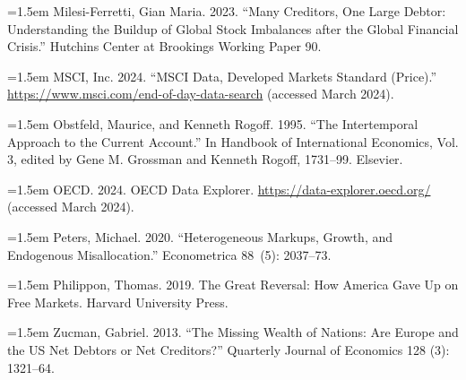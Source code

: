 \documentclass[11pt]{article}
\begin{document}
\noindent\hangindent=1.5em Milesi-Ferretti, Gian Maria. 2023. “Many Creditors, One Large Debtor: Understanding the Buildup of Global Stock Imbalances after the Global Financial Crisis.” Hutchins Center at Brookings Working Paper 90.\par

\noindent\hangindent=1.5em MSCI, Inc. 2024. “MSCI Data, Developed Markets Standard (Price).” \url{https://www.msci.com/end-of-day-data-search} (accessed March 2024).\par

\noindent\hangindent=1.5em Obstfeld, Maurice, and Kenneth Rogoff. 1995. “The Intertemporal Approach to the Current Account.” In Handbook of International Economics, Vol. 3, edited by Gene M. Grossman and Kenneth Rogoff, 1731–99. Elsevier.\par

\noindent\hangindent=1.5em OECD. 2024. OECD Data Explorer. \url{https://data-explorer.oecd.org/} (accessed March 2024).\par

\noindent\hangindent=1.5em Peters, Michael. 2020. “Heterogeneous Markups, Growth, and Endogenous Misallocation.” Econometrica 88 (5): 2037–73.\par

\noindent\hangindent=1.5em Philippon, Thomas. 2019. The Great Reversal: How America Gave Up on Free Markets. Harvard University Press.\par

\noindent\hangindent=1.5em Zucman, Gabriel. 2013. “The Missing Wealth of Nations: Are Europe and the US Net Debtors or Net Creditors?” Quarterly Journal of Economics 128 (3): 1321–64.\par
\end{document}

